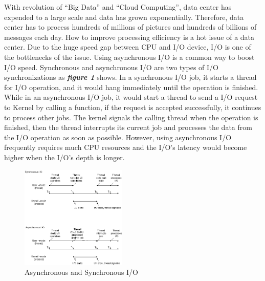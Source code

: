\documentclass[conference]{IEEEtran}
\begin{document}
    
With revolution of “Big Data” and “Cloud Computing”, data center has expended to a large scale and data has grown exponentially. 
Therefore, data center has to process hundreds of millions of pictures and hundreds of billions of messages each day.
How to improve processing efficiency is a hot issue of a data center. 
Due to the huge speed gap between CPU and I/O device, I/O is one of the bottlenecks of the issue.
Using asynchronous I/O is a common way to boost I/O speed. Synchronous and asynchronous I/O are two types of I/O synchronizations as  \emph{\textbf{\large{figure 1}}} shows. 
In a synchronous I/O job, it starts a thread for I/O operation, and it would hang immediately until the operation is finished.
While in an asynchronous I/O job, it would start a thread to send a I/O request to Kernel by calling a function, if the request is accepted successfully, it continues to process other jobs. 
The kernel signals the calling thread when the operation is finished, then the thread interrupts its current job and processes the data from the I/O operation as soon as possible.
However, using asynchronous I/O frequently requires much CPU resources and the I/O's latency would become higher when the I/O's depth is longer.

\begin{figure}[htbp]
        \centering
        \includegraphics[width=0.45\textwidth]{fig2bedit.png}
        \caption{Asynchronous and Synchronous I/O}
\end{figure}
\end{document}
